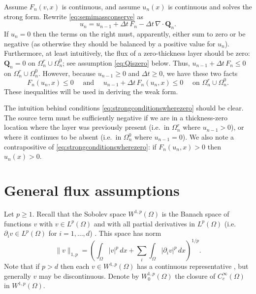 \documentclass[final,leqno,onefignum,onetabnum]{siamltex1213bueler}
\newcommand\bQ{\mathbf{Q}}
\newcommand{\Div}{\nabla\cdot}
\begin{document}
Assume $F_n(v,x)$ is continuous, and assume $u_n(x)$ is continuous and solves the strong form.  Rewrite \eqref{eq:semimassconserve} as
    $$u_n = u_{n-1} + \Delta t\, F_n - \Delta t\, \Div \bQ_n.$$
If $u_n=0$ then the terms on the right must, apparently, either sum to zero or be negative (as otherwise they should be balanced by a positive value for $u_n$).  Furthermore, at least intuitively, the flux of a zero-thickness layer should be zero: $\bQ_n=0$ on $\Omega_n^r \cup \Omega_n^0$; see assumption \eqref{eq:Qiszero} below.  Thus, $u_{n-1}+\Delta t\, F_n \le 0$ on $\Omega_n^r \cup \Omega_n^0$.  However, because $u_{n-1}\ge 0$ and $\Delta t\ge 0$, we have these two facts
\begin{equation}
F_n(u_n,x) \le 0 \quad \text{ and } \quad u_{n-1} + \Delta t\, F_n(u_n,x) \le 0 \quad \text{ on } \Omega_n^r \cup \Omega_n^0. \label{eq:strongconditionswherezero}
\end{equation}
These inequalities will be used in deriving the weak form.

The intuition behind conditions \eqref{eq:strongconditionswherezero} should be clear.  The source term must be sufficiently negative if we are in a thickness-zero location where the layer was previously present (i.e.~in $\Omega_n^r$ where $u_{n-1}>0$), or where it continues to be absent (i.e.~in $\Omega_n^0$ where $u_{n-1}=0$).  We also note a contrapositive of \eqref{eq:strongconditionswherezero}: if $F_n(u_n,x)>0$ then $u_n(x)>0$.


\section{General flux assumptions} \label{sec:fluxassumptions}

Let $p\ge 1$.  Recall that the Sobolev space $W^{1,p}(\Omega)$ is the Banach space of functions $v$ with $v\in L^p(\Omega)$ and with all partial derivatives in $L^p(\Omega)$ (i.e.~$\partial_i v \in L^p(\Omega)$ for $i=1,\dots,d$) \cite{Evans}.  This space has norm
\begin{equation}
  \|v\|_{1,p} = \left(\int_\Omega |v|^p\,dx + \sum_i \int_\Omega |\partial_i v|^p\,dx\right)^{1/p}.  \label{eq:norm}
\end{equation}
Note that if $p>d$ then each $v\in W^{1,p}(\Omega)$ has a continuous representative \cite[``Morrey's inequality'']{Evans}, but generally $v$ may be discontinuous.  Denote by $W_0^{1,p}(\Omega)$ the closure of $C_c^\infty(\Omega)$ in $W^{1,p}(\Omega)$.
\end{document}
